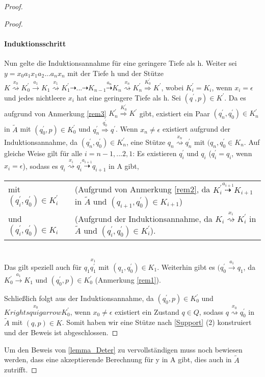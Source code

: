 \begin{proof}
\begin{proof}
\paragraph*{Induktionsschritt} 
Nun gelte die Induktionsannahme für eine geringere Tiefe als h. Weiter sei $y=x_0a_1x_1a_2...a_nx_n$ mit der Tiefe h und der Stütze $K \stackrel{x_0}{\rightsquigarrow} K_0^{\prime} \stackrel{a_1}{\rightarrow} K_1\stackrel{x_1}{\rightsquigarrow} K_1^{\prime} \dashrightarrow ... \dashrightarrow K_{n-1} \stackrel{a_n}{\dashrightarrow} K_n \stackrel{x_n}{\rightsquigarrow} K_n^\prime \stackrel{K_0^{\prime}} {\Rightarrow} K^\prime$, wobei $K_i^\prime = K_i$, wenn $x_i= \epsilon$ und jedes nichtleere $x_i$ hat eine geringere Tiefe als h. Sei $(q^\prime, p) \in K^\prime$. Da es aufgrund von Anmerkung \ref{rem3} $K_n^\prime \stackrel{K_0^\prime} {\Rightarrow} K^\prime$ gibt, existiert ein Paar $(q_n^\prime, q_0^\prime) \in K_n^\prime$ in $\tilde{A}$ mit $(q_0^\prime, p) \in K_0^\prime$ und $q_n^\prime \stackrel{q_0^\prime}{\Rightarrow} q^\prime$. Wenn $x_n \neq \epsilon$ existiert aufgrund der Induktionsannahme, da $(q_n^\prime, q_0^\prime) \in K_n^\prime$, eine Stütze $q_n \stackrel{x_n}{\rightsquigarrow} q_n^\prime$ mit $(q_n, q_0^\prime \in K_n$. Auf gleiche Weise gilt für alle $i=n-1,...2,1$: Es existieren $q_i^\prime$ und $q_i$ ($q_i^\prime=q_i$, wenn $x_i= \epsilon$), sodass es $q_i \stackrel{x_i}{\rightsquigarrow} q_i^\prime \stackrel{a_{i+1}}{\dashrightarrow}q_{i+1}$ in A gibt,

\begin{tabular}{l p{8cm}}
mit $(q_i^\prime, q_0^\prime) \in K_i^\prime$ & (Aufgrund von Anmerkung \ref{rem2}, da $K_i^\prime \stackrel{a_{i+1}}{\dashrightarrow} K_{i+1}$ in $\tilde{A}$ und $(q_{i+1}, q_0^\prime) \in K_{i+1}$)\\

 und $(q_i^\prime, q_0^\prime) \in K_i$ & (Aufgrund der Induktionsannahme, da $K_i \stackrel{x_i}{\rightsquigarrow} K_i^\prime$ in $\tilde{A}$ und $(q_i^\prime, q_0^\prime) \in K_i^\prime$).
  \end{tabular}\\
 Das gilt speziell auch für $q_1 \stackrel{x_1}{q_1^\prime}$ mit $(q_1, q_0^\prime) \in K_1$. Weiterhin gibt es $(q_0^\prime \stackrel{a_1}{\rightarrow} q_1$, da $K_0^\prime \stackrel{a_1} {\rightarrow} K_1$ und $(q_0^\prime, p) \in K_0^\prime$ (Anmerkung \ref{rem1}).
 
 Schließlich folgt aus der Induktionsannahme, da $(q_0^\prime, p) \in K_0^\prime$ und $K\stackrel{x_0}{rightsquigarrow} K_0^\prime$, wenn $x_0 \neq \epsilon$ existiert ein Zustand $q \in Q$, sodass $q \stackrel{x_0}{\rightsquigarrow} q_0^\prime$ in $\tilde{A}$ mit $(q,p) \in K$. Somit haben wir eine Stütze nach \autoref{Support} (2) konstruiert und der Beweis ist abgeschlossen.
  \end{proof}
Um den Beweis von \autoref{lemma_Deter} zu vervollständigen muss noch bewiesen werden, dass eine akzeptierende Berechnung für y in A gibt, dies auch in $\tilde{A}$ zutrifft. 


\end{proof}
